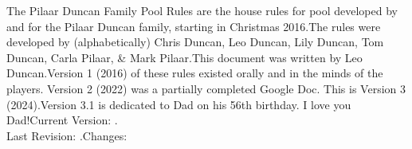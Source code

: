 
\renewcommand{\thesection}{\Alph{section}}


The Pilaar Duncan Family Pool Rules are the house rules for pool developed by and for the Pilaar Duncan family, starting in Christmas 2016.\standardspace[large]
The rules were developed by (alphabetically) Chris Duncan, Leo Duncan, Lily Duncan, Tom Duncan, Carla Pilaar, \& Mark Pilaar.\standardspace[large]
This document was written by Leo Duncan.\standardspace[large]
Version 1 (2016) of these rules existed orally and in the minds of the players. Version 2 (2022) was a partially completed Google Doc. This is Version 3 (2024).\standardspace[large]
Version 3.1 is dedicated to Dad on his 56th birthday. I love you Dad!\standardspace[large]
Current Version: \currentversion.\\
Last Revision: \currentversiondate.\standardspace[large]
Changes: {\small \githublink}

\newpage


